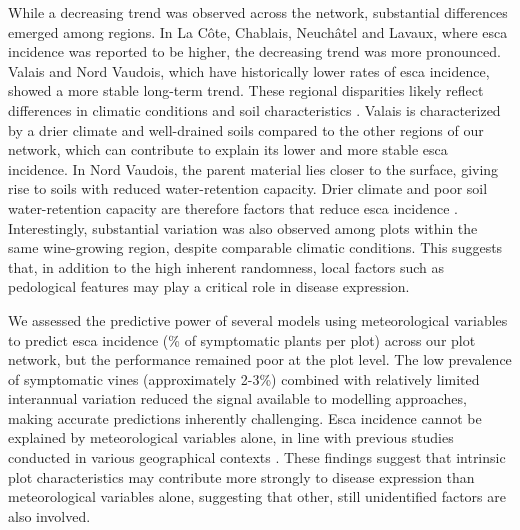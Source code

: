 While a decreasing trend was observed across the network, substantial differences emerged among regions. In La Côte, Chablais, Neuchâtel and Lavaux, where esca incidence was reported to be higher, the decreasing trend was more pronounced. Valais and Nord Vaudois, which have historically lower rates of esca incidence, showed a more stable long-term trend. These regional disparities likely reflect differences in climatic conditions and soil characteristics \citep{calzarano_rainfall_2018,marchi_observations_2006,monod_identifying_2025}. Valais is characterized by a drier climate \citep{zumbrunnen_linking_2009} and well-drained soils \citep{sigales_etude_2007} compared to the other regions of our network, which can contribute to explain its lower and more stable esca incidence. In Nord Vaudois, the parent material lies closer to the surface, giving rise to soils with reduced water-retention capacity. Drier climate and poor soil water-retention capacity are therefore factors that reduce esca incidence \citep{bortolami_grapevines_2021,etienne_identification_2026,monod_identifying_2025}. Interestingly, substantial variation was also observed among plots within the same wine-growing region, despite comparable climatic conditions. This suggests that, in addition to the high inherent randomness, local factors such as pedological features may play a critical role in disease expression.

We assessed the predictive power of several models using meteorological variables to predict esca incidence (\% of symptomatic plants per plot) across our plot network, but the performance remained poor at the plot level. The low prevalence of symptomatic vines (approximately 2-3\%) combined with relatively limited interannual variation reduced the signal available to modelling approaches, making accurate predictions inherently challenging. Esca incidence cannot be explained by meteorological variables alone, in line with previous studies conducted in various geographical contexts \citep{bruez_overview_2012,dewasme_long-term_2022,etienne_identification_2026,lecomte_logistic_2024}. These findings suggest that intrinsic plot characteristics may contribute more strongly to disease expression than meteorological variables alone, suggesting that other, still unidentified factors are also involved.

